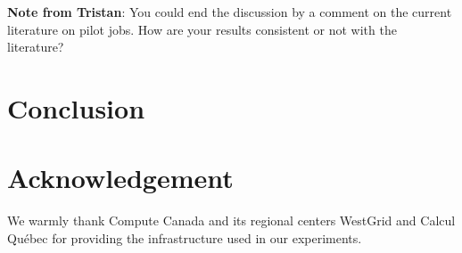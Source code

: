 \documentclass{IEEEtran}
\newcommand{\tristan}[1]{\color{red}\textbf{Note from Tristan}:
      #1 \color{black}}
\newcommand{\TG}[1]{\tristan{#1}}
\begin{document}
\TG{You could end the discussion by a comment on the current literature on pilot jobs. How are your results
consistent or not with the literature?}


\section{Conclusion}\label{sec:conclusion}

\section*{Acknowledgement}

We warmly thank Compute Canada and its regional centers WestGrid and Calcul
Qu\'ebec for providing the infrastructure used in our experiments.

 

\end{document}
